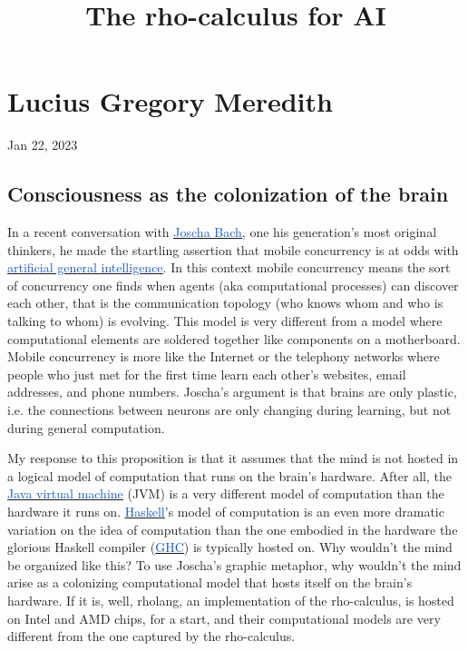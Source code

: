 \documentclass[10pt]{report}
\title{The rho-calculus for AI}
\date{}
\author{}
\begin{document}
\maketitle

\chapter{Lucius Gregory Meredith}

\begin{center}
Jan 22, 2023
\end{center}


\vspace{1\baselineskip}
\section{Consciousness as the colonization of the brain}

In a recent conversation with \href{https://en.wikipedia.org/wiki/Joscha_Bach}{\uline{\textcolor[HTML]{1155CC}{Joscha Bach}}}, one his generation’s most original thinkers, he made the startling assertion that mobile concurrency is at odds with \href{https://en.wikipedia.org/wiki/Artificial_general_intelligence}{\uline{\textcolor[HTML]{1155CC}{artificial general intelligence}}}. In this context mobile concurrency means the sort of concurrency one finds when agents (aka computational processes) can discover each other, that is the communication topology (who knows whom and who is talking to whom) is evolving. This model is very different from a model where computational elements are soldered together like components on a motherboard. Mobile concurrency is more like the Internet or the telephony networks where people who just met for the first time learn each other’s websites, email addresses, and phone numbers. Joscha’s argument is that brains are only plastic, i.e. the connections between neurons are only changing during learning, but not during general computation.

\vspace{1\baselineskip}
My response to this proposition is that it assumes that the mind is not hosted in a logical model of computation that runs on the brain’s hardware. After all, the \href{https://en.wikipedia.org/wiki/Java_virtual_machine}{\uline{\textcolor[HTML]{1155CC}{Java virtual machine}}} (JVM) is a very different model of computation than the hardware it runs on. \href{https://en.wikipedia.org/wiki/Haskell}{\uline{\textcolor[HTML]{1155CC}{Haskell}}}’s model of computation is an even more dramatic variation on the idea of computation than the one embodied in the hardware the glorious Haskell compiler (\href{https://en.wikipedia.org/wiki/GHC}{\uline{\textcolor[HTML]{1155CC}{GHC}}}) is typically hosted on. Why wouldn’t the mind be organized like this? To use Joscha’s graphic metaphor, why wouldn’t the mind arise as a colonizing computational model that hosts itself on the brain’s hardware. If it is, well, rholang, an implementation of the rho-calculus, is hosted on Intel and AMD chips, for a start, and their computational models are very different from the one captured by the rho-calculus. 
\end{document}

